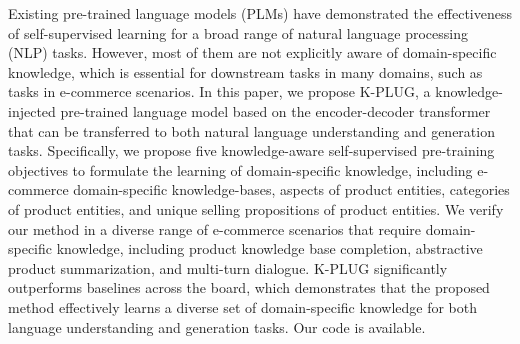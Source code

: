 Existing pre-trained language models (PLMs) have demonstrated the effectiveness of self-supervised learning for a broad range of natural language processing (NLP) tasks. However, most of them are not explicitly aware of domain-specific knowledge, which is essential for downstream tasks in many domains, such as tasks in e-commerce scenarios. In this paper, we propose K-PLUG, a knowledge-injected pre-trained language model based on the encoder-decoder transformer that can be transferred to both natural language understanding and generation tasks. Specifically, we propose five knowledge-aware self-supervised pre-training objectives to formulate the learning of domain-specific knowledge, including e-commerce domain-specific knowledge-bases, aspects of product entities,  categories of product entities, and unique selling propositions of product entities. We verify our method in a diverse range of e-commerce scenarios that require domain-specific knowledge, including product knowledge base completion, abstractive product summarization, and multi-turn dialogue. K-PLUG significantly outperforms baselines across the board, which demonstrates that the proposed method effectively learns a diverse set of domain-specific knowledge for both language understanding and generation tasks. Our code is available.
